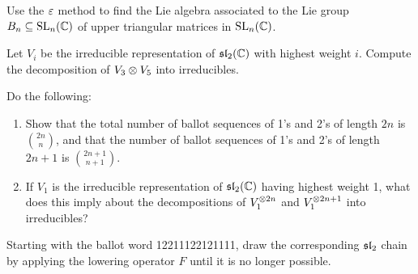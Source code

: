 \documentclass[12pt]{memoir}
\begin{document}
\begin{Ej}
    Use the $\varepsilon$ method to ﬁnd the Lie algebra associated to the Lie group $B_n\subseteq\mathrm{SL}_n(\mathbb{C})$ of upper
triangular matrices in $\mathrm{SL}_n(\mathbb{C})$.
\end{Ej}

\begin{Ej}
    Let $V_i$ be the irreducible representation of $\mathfrak{sl}_2(\mathbb{C})$ with highest weight $i$. Compute the
decomposition of $V_3\otimes V_5$ into irreducibles.
\end{Ej}

\begin{Ej}
    Do the following:
    \begin{enumerate}
        \item Show that the total number of ballot sequences of 1's and 2's of length $2n$ is $\binom{2n}{n}$, and
        that the number of ballot sequences of 1's and 2's of length $2n + 1$ is $\binom{2n+1}{n+1}$.
        \item If $V_1$ is the irreducible representation of $\mathfrak{sl}_2(\mathbb{C})$ having highest weight 1, what does this
        imply about the decompositions of $V_1^{\otimes 2n}$ and $V_1^{\otimes 2n+1}$ into irreducibles?
    \end{enumerate}
\end{Ej}

\begin{Ej}
    Starting with the ballot word 12211122121111, draw the corresponding $\mathfrak{sl}_2$ chain by applying the lowering operator $F$ until it is no longer possible.
\end{Ej}
\end{document}
